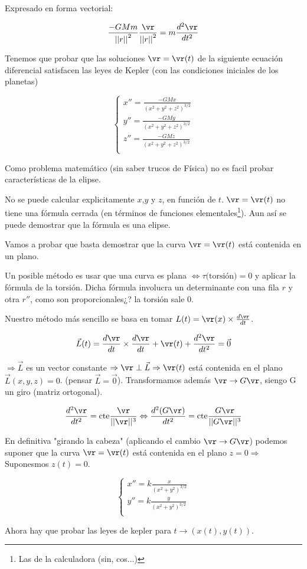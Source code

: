 Expresado en forma vectorial:

$$ \frac{-GMm}{{||r||}^2} \frac{\vr}{{||r||}^2}  =  m \frac{d^2\vr}{d t^2}$$


Tenemos que probar que las soluciones $\vr = \vr(t)$
 de la siguiente ecuación diferencial satisfacen las leyes de Kepler (con las condiciones iniciales de los planetas)


$$
\begin{cases}
 x'' = \frac{-GMx}{(x^2 + y^2 + z^2)^{3/2}}\\
 y'' = \frac{-GMy}{(x^2 + y^2 + z^2)^{3/2}}\\
 z'' = \frac{-GMz}{(x^2 + y^2 + z^2)^{3/2}}\\
\end{cases}
$$


 Como problema matemático (sin saber trucos de Física) no es facil probar características de la elipse. 

 \begin{obs}
 No se puede calcular explicitamente $x$,$y$ y $z$, en función de $t$. $\vr = \vr(t)$ no tiene una fórmula cerrada (en términos de funciones elementales\footnote{Las de la calculadora (sin, cos...)}). Aun así se puede demostrar que la fórmula es una elipse.
 \end{obs}


Vamos a probar que basta demostrar que la curva $\vr = \vr(t)$ está contenida en un plano. 

Un posible método es usar que una curva es plana $\Leftrightarrow \tau \text{(torsión)} = 0$ y aplicar la fórmula de la torsión. Dicha fórmula involucra un determinante con una fila $r$ y otra $r''$, como son proporcionales¿? la torsión sale 0.


Nuestro método más sencillo se basa en tomar $L(t) = \vr(x) \times \frac{d\vr}{dt}$.

$$\vec{L}(t) = \frac{d\vr}{dt} \times \frac{d\vr}{dt} + \vr(t) + \frac{d^2\vr}{dt^2} = \vec{0}$$ 

$\Rightarrow \vec{L}$ es un vector constante $\Rightarrow \vr \perp \vec{L} \Rightarrow \vr(t)$ está contenida en el plano $\vec{L}(x,y,z) = 0 $.
(pensar $\vec{L} = \vec{0}$). Transformamos además $\vr \rightarrow G\vr$, siengo G un giro (matriz ortogonal).

$$\frac{d^2\vr}{dt^2} = \text{cte}\frac{\vr}{||\vr||^3} \Leftrightarrow \frac{d^2(G\vr)}{dt^2} = \text{cte}\frac{G\vr}{||G\vr||^3}$$

En definitiva "girando la cabeza" (aplicando el cambio $\vr \rightarrow G\vr$) podemos suponer que la curva $\vr = \vr(t)$ está contenida en el plano $z = 0 \Rightarrow$ Suponesmos $z(t) = 0$.


$$
\begin{cases}
 x'' = k\frac{x}{(x^2 + y^2)^{3/2}}\\
 y'' = k\frac{y}{(x^2 + y^2)^{3/2}}\\
\end{cases}
$$

Ahora hay que probar las leyes de kepler para $t \rightarrow (x(t), y(t))$.





